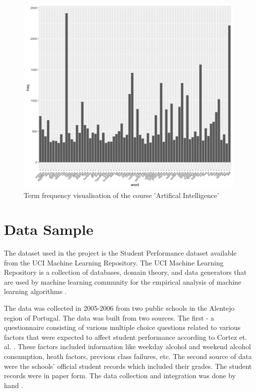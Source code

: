 \documentclass[conference]{IEEEtran}
\begin{document}
\begin{figure}
	\includegraphics[width=\linewidth]{ai-vis.jpg}
	\caption{Term frequency visualisation of the course 'Artifical Intelligence'}
	\label{fig:ai-vis}
\end{figure}

	\section{Data Sample}

The dataset used in the project is the Student Performance dataset available from the UCI 
Machine Learning Repository. The UCI Machine Learning Repository is a collection of databases, 
domain theory, and data generators that are used by machine learning community for the empirical 
analysis of machine learning algorithms \cite{Lichman:2013}.

The data was collected in 2005-2006 from two public schools in the Alentejo region of Portugal. 
The data was built from two sources. The first - a questionnaire consisting of various multiple choice 
questions related to various factors that were expected to affect student performance according 
to Cortez et. al. \cite{ref:4}. These factors included information like weekday alcohol and 
weekend alcohol consumption, heath factors, previous class failures, etc. The second source of 
data were the schools' official student records which included their grades. The student records 
were in paper form. The data collection and integration was done by hand \cite{ref:4}.
\end{document}
